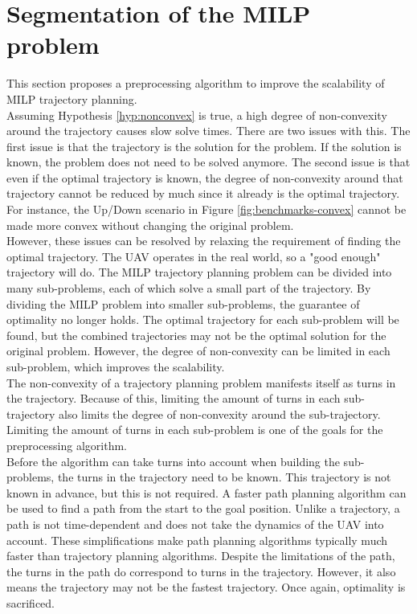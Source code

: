 \section{Segmentation of the MILP problem}
\label{section:segment}
This section proposes a preprocessing algorithm to improve the scalability of MILP trajectory planning.\\ 
Assuming Hypothesis \ref{hyp:nonconvex} is true, a high degree of non-convexity around the trajectory causes slow solve times. There are two issues with this. The first issue is that the trajectory is the solution for the problem. If the solution is known, the problem does not need to be solved anymore. The second issue is that even if the optimal trajectory is known, the degree of non-convexity around that trajectory cannot be reduced by much since it already is the optimal trajectory. For instance, the Up/Down scenario in Figure \ref{fig:benchmarks-convex} cannot be made more convex without changing the original problem.\\
However, these issues can be resolved by relaxing the requirement of finding the optimal trajectory. The UAV operates in the real world, so a "good enough" trajectory will do. The MILP trajectory planning problem can be divided into many sub-problems, each of which solve a small part of the trajectory. By dividing the MILP problem into smaller sub-problems, the guarantee of optimality no longer holds. The optimal trajectory for each sub-problem will be found, but the combined trajectories may not be the optimal solution for the original problem. However, the degree of non-convexity can be limited in each sub-problem, which improves the scalability. \\
The non-convexity of a trajectory planning problem manifests itself as turns in the trajectory. Because of this, limiting the amount of turns in each sub-trajectory also limits the degree of non-convexity around the sub-trajectory. Limiting the amount of turns in each sub-problem is one of the goals for the preprocessing algorithm.\\
Before the algorithm can take turns into account when building the sub-problems, the turns in the trajectory need to be known. This trajectory is not known in advance, but this is not required. A faster path planning algorithm can be used to find a path from the start to the goal position. Unlike a trajectory, a path is not time-dependent and does not take the dynamics of the UAV into account. These simplifications make path planning algorithms typically much faster than trajectory planning algorithms. Despite the limitations of the path, the turns in the path do correspond to turns in the trajectory. However, it also means the trajectory may not be the fastest trajectory. Once again, optimality is sacrificed. \\
